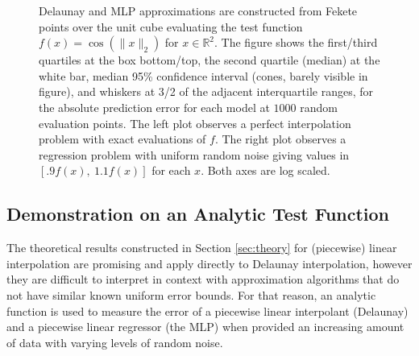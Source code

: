 \documentclass[smallextended,final]{svjour3}  %
\begin{document}
\begin{figure}
  \centering
  \caption{Delaunay and MLP approximations are constructed from Fekete
    points over the unit cube evaluating the test function $f(x) =
    \cos(\|x\|_2)$ for $x \in \mathbb{R}^2$. The figure shows the
    first/third quartiles at the box bottom/top, the second quartile
    (median) at the white bar, median 95\% confidence interval (cones,
    barely visible in figure), and whiskers at 3/2 of the adjacent
    interquartile ranges, for the absolute prediction error for each
    model at $1000$ random evaluation points. The left plot observes a
    perfect interpolation problem with exact evaluations of $f.$ The
    right plot observes a regression problem with uniform random noise
    giving values in $[.9 f(x),\ 1.1f(x)]$ for each $x.$ Both axes are
    log scaled.}
  \label{fig:convergence-2d}
\end{figure}

\vspace{-2mm}
\subsection{Demonstration on an Analytic Test Function}
\label{sec:analytic}

The theoretical results constructed in Section \ref{sec:theory} for
(piecewise) linear interpolation are promising and apply directly to
Delaunay interpolation, however they are difficult to interpret in
context with approximation algorithms that do not have similar known
uniform error bounds. For that reason, an analytic function is used to
measure the error of a piecewise linear interpolant (Delaunay) and a
piecewise linear regressor (the MLP) when provided an increasing
amount of data with varying levels of random noise.
\end{document}
